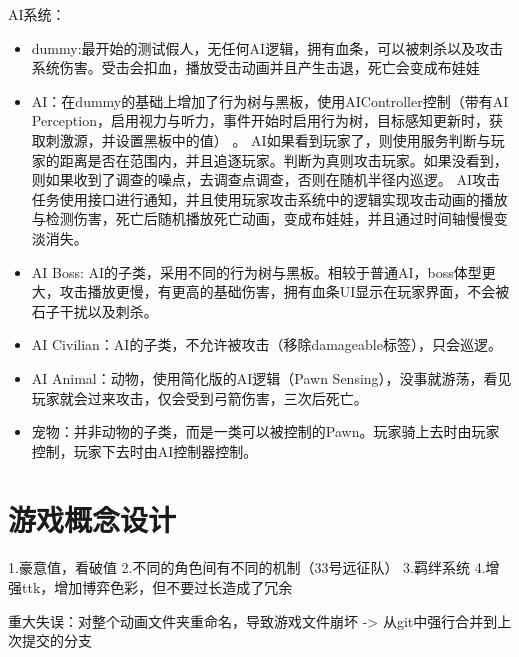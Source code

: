 \documentclass[11pt,oneside]{book}
\begin{document}
AI系统：
\begin{itemize}
    \item  dummy:最开始的测试假人，无任何AI逻辑，拥有血条，可以被刺杀以及攻击系统伤害。受击会扣血，播放受击动画并且产生击退，死亡会变成布娃娃
    \item  AI：在dummy的基础上增加了行为树与黑板，使用AIController控制（带有AI Perception，启用视力与听力，事件开始时启用行为树，目标感知更新时，获取刺激源，并设置黑板中的值） 。 
    AI如果看到玩家了，则使用服务判断与玩家的距离是否在范围内，并且追逐玩家。判断为真则攻击玩家。如果没看到，则如果收到了调查的噪点，去调查点调查，否则在随机半径内巡逻。
    AI攻击任务使用接口进行通知，并且使用玩家攻击系统中的逻辑实现攻击动画的播放与检测伤害，死亡后随机播放死亡动画，变成布娃娃，并且通过时间轴慢慢变淡消失。      
    \item  AI Boss: AI的子类，采用不同的行为树与黑板。相较于普通AI，boss体型更大，攻击播放更慢，有更高的基础伤害，拥有血条UI显示在玩家界面，不会被石子干扰以及刺杀。
    \item  AI Civilian：AI的子类，不允许被攻击（移除damageable标签），只会巡逻。
    \item  AI Animal：动物，使用简化版的AI逻辑（Pawn Sensing），没事就游荡，看见玩家就会过来攻击，仅会受到弓箭伤害，三次后死亡。
    \item  宠物：并非动物的子类，而是一类可以被控制的Pawn。玩家骑上去时由玩家控制，玩家下去时由AI控制器控制。





\end{itemize}

\chapter{游戏概念设计}

1.豪意值，看破值
2.不同的角色间有不同的机制（33号远征队）
3.羁绊系统
4.增强ttk，增加博弈色彩，但不要过长造成了冗余



重大失误：对整个动画文件夹重命名，导致游戏文件崩坏 -> 从git中强行合并到上次提交的分支



\end{document}
